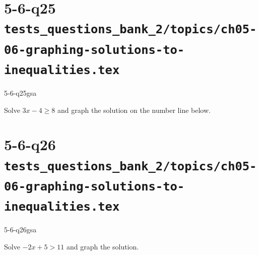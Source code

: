 \documentclass[12pt, fleqn, openany]{studyGuide}
\begin{document}
\newpage
\section*{5-6-q25 \hfill \normalsize\texttt{tests\_questions\_bank\_2/topics/ch05-06-graphing-solutions-to-inequalities.tex}}
\begin{practiceQuestion}{5-6-q25}{gsa}
\begin{questionText}
Solve $3x - 4 \geq 8$ and graph the solution on the number line below.

\begin{center}
\end{center}
\end{questionText}
\end{practiceQuestion}

\newpage
\section*{5-6-q26 \hfill \normalsize\texttt{tests\_questions\_bank\_2/topics/ch05-06-graphing-solutions-to-inequalities.tex}}
\begin{practiceQuestion}{5-6-q26}{gsa}
\begin{questionText}
Solve $-2x + 5 > 11$ and graph the solution.

\begin{center}
\end{center}
\end{questionText}
\end{practiceQuestion}

\newpage
\end{document}
